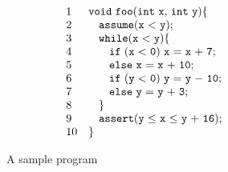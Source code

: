 \begin{figure}[t]
\begin{subfigure}{0.5\textwidth}
    \raggedright
    \vspace{0.5cm}

\vspace{-0.2cm} \[
 \begin{array}{ll}
1 & \code{void~foo(int ~x{,} ~int~y)\{} \\
2 & \code{~~~ assume(x~{<}~y);}  \\
3 & \code{~~~ while(x~{<}~y)\{}  \\
4 & \code{~~~ \quad if~(x~{<}~0)~x~{=}~x~{+}~7;}  \\
5 & \code{~~~ \quad else~ x~{=}~x~{+}~10;}\\
6 & \code{~~~ \quad if~(y~{<}~0)~y~{=}~y~{-}~10;} \\
7 & \code{~~~ \quad else~ y~{=}~y~{+}~3;}\\
8 & \code{~~~\}} \\
9 & \code{~~~assert(y~{\leq}~x~{\leq}~y~{+}~16);}\\
10  & \}
\end{array}
\]
    \vspace{-0.2cm}
    \caption{A sample program}
    \label{fig:running:example:program}
\end{subfigure}%
\begin{subfigure}{.5\textwidth}
      \centering

\end{subfigure}
\end{figure}
